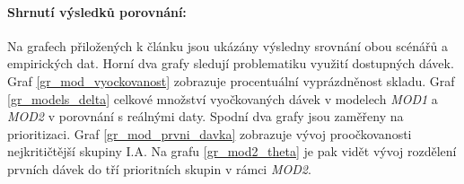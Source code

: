 \paragraph{Shrnutí výsledků porovnání:} Na grafech přiložených k článku jsou ukázány výsledny srovnání obou scénářů a empirických dat. Horní dva grafy sledují problematiku využití dostupných dávek. Graf \ref{gr_mod_vyockovanost} zobrazuje procentuální vyprázdněnost skladu. Graf \ref{gr_models_delta} celkové množství vyočkovaných dávek v modelech \emph{MOD1} a \emph{MOD2} v porovnání s reálnými daty.
%
Spodní dva grafy jsou zaměřeny na prioritizaci.
Graf \ref{gr_mod_prvni_davka} zobrazuje vývoj proočkovanosti nejkritičtější skupiny I.A. Na grafu  \ref{gr_mod2_theta} je pak vidět vývoj rozdělení prvních dávek do tří prioritních skupin v rámci \emph{MOD2}.


